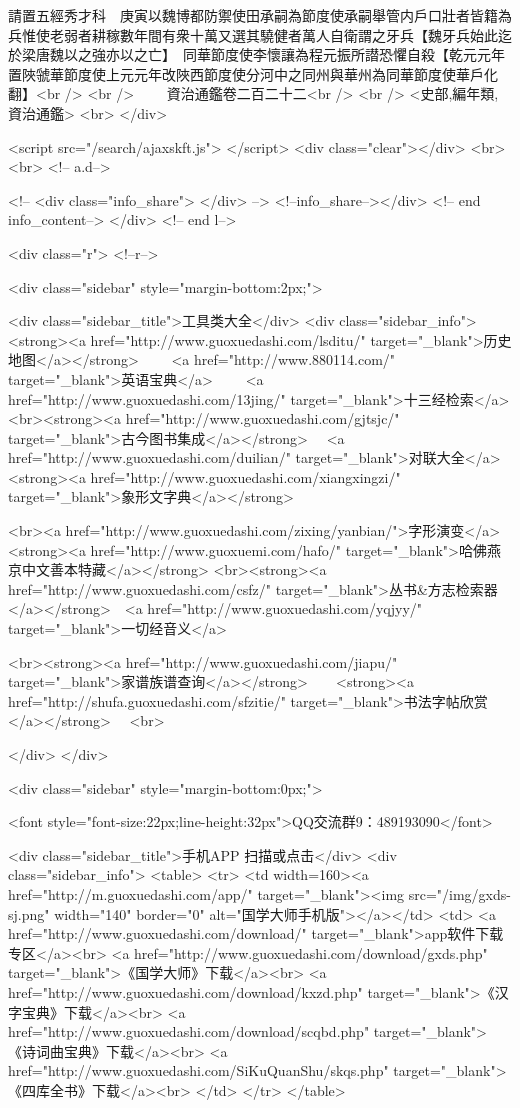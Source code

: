 請置五經秀才科　庚寅以魏博都防禦使田承嗣為節度使承嗣舉管内戶口壯者皆籍為兵惟使老弱者耕稼數年間有衆十萬又選其驍健者萬人自衛謂之牙兵【魏牙兵始此迄於梁唐魏以之強亦以之亡】　同華節度使李懷讓為程元振所譛恐懼自殺【乾元元年置陜虢華節度使上元元年改陜西節度使分河中之同州與華州為同華節度使華戶化翻】<br />
<br />
　　資治通鑑卷二百二十二<br />
<br />
<史部,編年類,資治通鑑>  <br>
   </div> 

<script src="/search/ajaxskft.js"> </script>
 <div class="clear"></div>
<br>
<br>
 <!-- a.d-->

 <!--
<div class="info_share">
</div> 
-->
 <!--info_share--></div>   <!-- end info_content-->
  </div> <!-- end l-->

<div class="r">   <!--r-->



<div class="sidebar"  style="margin-bottom:2px;">

 
<div class="sidebar_title">工具类大全</div>
<div class="sidebar_info">
<strong><a href="http://www.guoxuedashi.com/lsditu/" target="_blank">历史地图</a></strong>　　
<a href="http://www.880114.com/" target="_blank">英语宝典</a>　　
<a href="http://www.guoxuedashi.com/13jing/" target="_blank">十三经检索</a>　
<br><strong><a href="http://www.guoxuedashi.com/gjtsjc/" target="_blank">古今图书集成</a></strong>　
<a href="http://www.guoxuedashi.com/duilian/" target="_blank">对联大全</a>　<strong><a href="http://www.guoxuedashi.com/xiangxingzi/" target="_blank">象形文字典</a></strong>　

<br><a href="http://www.guoxuedashi.com/zixing/yanbian/">字形演变</a>　　<strong><a href="http://www.guoxuemi.com/hafo/" target="_blank">哈佛燕京中文善本特藏</a></strong>
<br><strong><a href="http://www.guoxuedashi.com/csfz/" target="_blank">丛书&方志检索器</a></strong>　<a href="http://www.guoxuedashi.com/yqjyy/" target="_blank">一切经音义</a>　　

<br><strong><a href="http://www.guoxuedashi.com/jiapu/" target="_blank">家谱族谱查询</a></strong>　　<strong><a href="http://shufa.guoxuedashi.com/sfzitie/" target="_blank">书法字帖欣赏</a></strong>　
<br>

</div>
</div>


<div class="sidebar" style="margin-bottom:0px;">

<font style="font-size:22px;line-height:32px">QQ交流群9：489193090</font>


<div class="sidebar_title">手机APP 扫描或点击</div>
<div class="sidebar_info">
<table>
<tr>
	<td width=160><a href="http://m.guoxuedashi.com/app/" target="_blank"><img src="/img/gxds-sj.png" width="140"  border="0" alt="国学大师手机版"></a></td>
	<td>
<a href="http://www.guoxuedashi.com/download/" target="_blank">app软件下载专区</a><br>
<a href="http://www.guoxuedashi.com/download/gxds.php" target="_blank">《国学大师》下载</a><br>
<a href="http://www.guoxuedashi.com/download/kxzd.php" target="_blank">《汉字宝典》下载</a><br>
<a href="http://www.guoxuedashi.com/download/scqbd.php" target="_blank">《诗词曲宝典》下载</a><br>
<a href="http://www.guoxuedashi.com/SiKuQuanShu/skqs.php" target="_blank">《四库全书》下载</a><br>
</td>
</tr>
</table>

